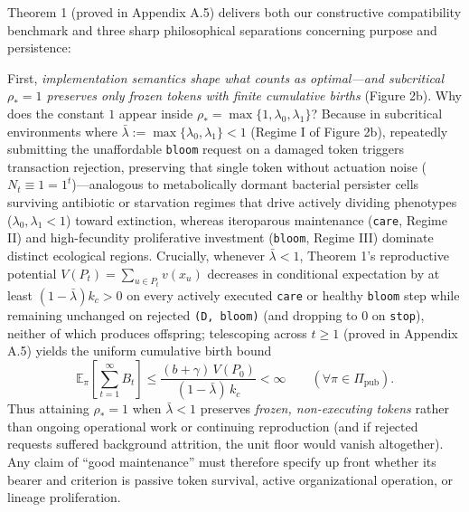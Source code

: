 \documentclass[11pt,a4paper]{article}
\begin{document}
Theorem 1 (proved in Appendix A.5) delivers both our constructive
compatibility benchmark and three sharp philosophical separations
concerning purpose and persistence:

First, \emph{implementation semantics shape what counts as optimal---and
subcritical \(\rho_* = 1\) preserves only frozen tokens with finite
cumulative births} (Figure 2b). Why does the constant \(1\) appear
inside \(\rho_* = \max\{1, \lambda_0, \lambda_1\}\)? Because in
subcritical environments where
\(\bar{\lambda} := \max\{\lambda_0, \lambda_1\} < 1\) (Regime I of
Figure 2b), repeatedly submitting the unaffordable \texttt{bloom}
request on a damaged token triggers transaction rejection, preserving
that single token without actuation noise
(\(N_t \equiv 1 = 1^t\))---analogous to metabolically dormant bacterial
persister cells surviving antibiotic or starvation regimes that drive
actively dividing phenotypes (\(\lambda_0, \lambda_1 < 1\)) toward
extinction, whereas iteroparous maintenance (\texttt{care}, Regime II)
and high-fecundity proliferative investment (\texttt{bloom}, Regime III)
dominate distinct ecological regions. Crucially, whenever
\(\bar{\lambda} < 1\), Theorem 1's reproductive potential
\(V(P_t) = \sum_{u \in P_t} v(x_u)\) decreases in conditional
expectation by at least \((1 - \bar{\lambda}) k_c > 0\) on every
actively executed \texttt{care} or healthy \texttt{bloom} step while
remaining unchanged on rejected \texttt{(D,\ bloom)} (and dropping to
\(0\) on \texttt{stop}), neither of which produces offspring;
telescoping across \(t \ge 1\) (proved in Appendix A.5) yields the
uniform cumulative birth bound
\[\mathbb{E}_\pi\!\left[\sum_{t=1}^{\infty} B_t\right] \le \frac{(b + \gamma)\, V(P_0)}{(1 - \bar{\lambda})\, k_c} < \infty \qquad (\forall \pi \in \Pi_{\mathrm{pub}}).\]
Thus attaining \(\rho_* = 1\) when \(\bar{\lambda} < 1\) preserves
\emph{frozen, non-executing tokens} rather than ongoing operational work
or continuing reproduction (and if rejected requests suffered background
attrition, the unit floor would vanish altogether). Any claim of ``good
maintenance'' must therefore specify up front whether its bearer and
criterion is passive token survival, active organizational operation, or
lineage proliferation.
\end{document}
